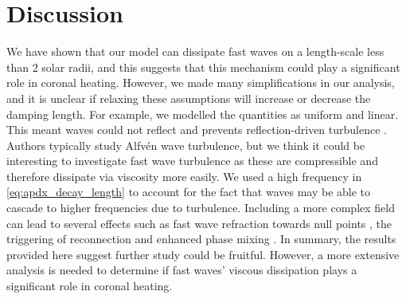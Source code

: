 \section{Discussion}

We have shown that our model can dissipate fast waves on a length-scale less than 2 solar radii, and this suggests that this mechanism could play a significant role in coronal heating. However, we made many simplifications in our analysis, and it is unclear if relaxing these assumptions will increase or decrease the damping length. For example, we modelled the quantities as uniform and linear. This meant waves could not reflect and prevents reflection-driven turbulence \citep{Hollweg1986a,vanBallegooijen2011,Shoda2019}. Authors typically study Alfv\'en wave turbulence, but we think it could be interesting to investigate fast wave turbulence as these are compressible and therefore dissipate via viscosity more easily. We used a high frequency in \eqref{eq:apdx_decay_length} to account for the fact that waves may be able to cascade to higher frequencies due to turbulence. Including a more complex field can lead to several effects such as fast wave refraction towards null points \citep{McLaughlin2006,McLaughlin2011,McLaughlin2016}, the triggering of reconnection \citep{McLaughlin2009} and enhanced phase mixing \citep{Similon1989,Howson2020a}. In summary, the results provided here suggest further study could be fruitful. However,  a more extensive analysis is needed to determine if fast waves' viscous dissipation plays a significant role in coronal heating.